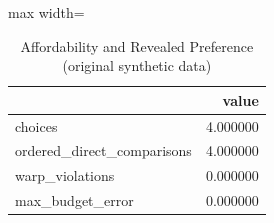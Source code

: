 \begin{table}[htbp]
\centering
\caption{Affordability and Revealed Preference (original synthetic data)}
\begingroup
\small
\setlength{\tabcolsep}{6pt}
\renewcommand{\arraystretch}{1.12}
\begin{adjustbox}{max width=\linewidth}
\begin{tabular}{@{}lr@{}}
\toprule
 & value \\
\midrule
choices & 4.000000 \\
ordered\_direct\_comparisons & 4.000000 \\
warp\_violations & 0.000000 \\
max\_budget\_error & 0.000000 \\
\bottomrule
\end{tabular}
\end{adjustbox}
\endgroup
\end{table}